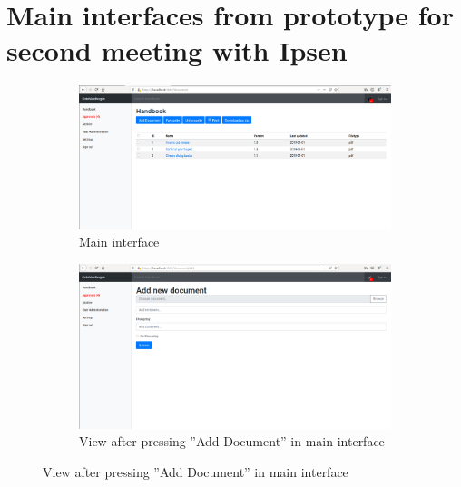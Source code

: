 \newpage
\section{Main interfaces from prototype for second meeting with Ipsen}\label{sec:1prototype}
\begin{figure}[H]
	\centering
	\begin{subfigure}[b]{0.48\textwidth}
		\includegraphics[width=\textwidth]{billeder/iteration1Prototyper/Handbook.png}
		\caption{Main interface}
		\label{fig:3-main}
	\end{subfigure}
	\quad
	\begin{subfigure}[b]{0.48\textwidth}
		\includegraphics[width=\textwidth]{billeder/iteration1Prototyper/Add-Document.png}
		\caption{View after pressing ''Add Document'' in main interface}
		\label{fig:3-addDoc}
	\end{subfigure}
\end{figure}
